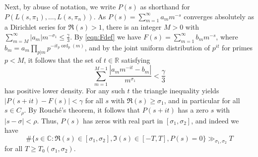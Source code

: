 \documentclass[11pt]{amsart}
\theoremstyle{remark}
\numberwithin{theorem}{section}
\numberwithin{equation}{section}
\newcommand{\R}{\mathbb{R}}
\newcommand{\C}{\mathbb{C}}
\DeclareMathOperator{\ord}{ord}
\begin{document}
Next, by abuse of notation, we write $P(s)$ as shorthand for
$P(L(s,\pi_1),\ldots,L(s,\pi_n))$. As
$P(s)=\sum_{m=1}^\infty a_mm^{-s}$ converges absolutely as a Dirichlet
series for $\Re(s) > 1$, there is an integer
$M > 0$ with
$\sum_{m=M}^{\infty}|a_m|m^{-\sigma_1}\le\frac{\gamma}3$.
By \eqref{eqn:Fdef} we have
$F(s)=\sum_{m=1}^\infty b_mm^{-s}$, where
$b_m=a_m\prod_{p|m}p^{-it_p\ord_p(m)}$, and
by the joint uniform distribution of $p^{it}$ for primes $p<M$, it
follows that the set of $t\in\R$ satisfying
\[\sum_{m=1}^{M-1}\frac{|a_mm^{-it}-b_m|}{m^{\sigma_1}}<\frac{\gamma}3\]
has positive lower density.  For any such $t$ the triangle
inequality yields $|P(s+it)-F(s)|<\gamma$ for all $s$ with
$\Re(s)\ge\sigma_1$, and in particular for all $s\in C_\rho$.
By Rouch\'e's theorem, it follows that $P(s+it)$
has a zero $s$ with $|s-\sigma|<\rho$.
Thus, $P(s)$ has zeros with real part in $[\sigma_1,\sigma_2]$, and indeed we have
$$
\#\{s\in\C:\Re(s)\in[\sigma_1,\sigma_2],
\Im(s)\in[-T,T], P(s)=0\}
\gg_{\sigma_1,\sigma_2}T
$$
for all $T\ge T_0(\sigma_1,\sigma_2)$.
\end{document}
